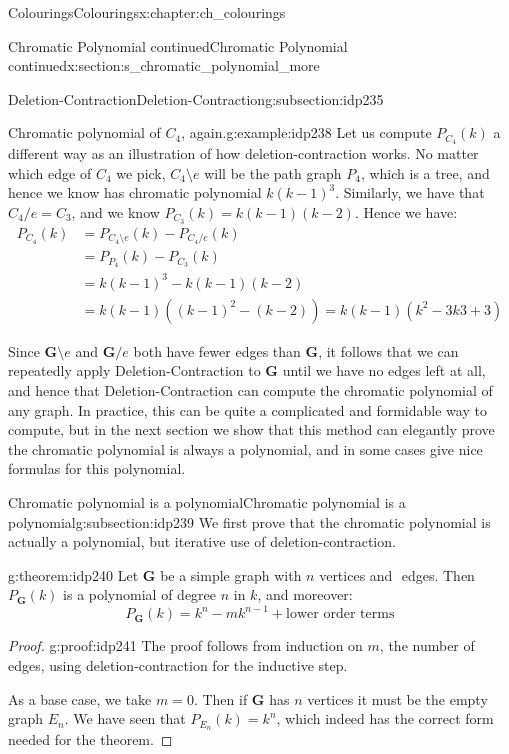 \documentclass[oneside,10pt,]{book}
\numberwithin{equation}{section}
\newcommand{\bfG}{\mathbf{G}}
\newcommand{\amp}{&}
\begin{document}
\begin{chapterptx}{Colourings}{}{Colourings}{}{}{x:chapter:ch_colourings}
\begin{sectionptx}{Chromatic Polynomial continued}{}{Chromatic Polynomial continued}{}{}{x:section:s_chromatic_polynomial_more}
\begin{subsectionptx}{Deletion-Contraction}{}{Deletion-Contraction}{}{}{g:subsection:idp235}
\begin{example}{Chromatic polynomial of \(C_4\), again.}{g:example:idp238}
Let us compute \(P_{C_4}(k)\) a different way as an illustration of how deletion-contraction works.  No matter which edge of \(C_4\) we pick, \(C_4\setminus e\) will be the path graph \(P_4\), which is a tree, and hence we know has chromatic polynomial \(k(k-1)^3\).  Similarly, we have that \(C_4/e=C_3\), and we know \(P_{C_3}(k)=k(k-1)(k-2)\).  Hence we have:%
%
\begin{align*}
P_{C_4}(k) \amp = P_{C_4\setminus e}(k)-P_{C_4/e}(k) \\
\amp = P_{P_4}(k)-P_{C_3}(k) \\
\amp = k(k-1)^3 - k(k-1)(k-2) \\
\amp = k(k-1)\left( (k-1)^2-(k-2)\right) = k(k-1)(k^2-3k3+3)
\end{align*}
\end{example}
Since \(\bfG\setminus e\) and \(\bfG/e\) both have fewer edges than \(\bfG\), it follows that we can repeatedly apply Deletion-Contraction to \(\bfG\) until we have no edges left at all, and hence that Deletion-Contraction can compute the chromatic polynomial of any graph.  In practice, this can be quite a complicated and formidable way to compute, but in the next section we show that this method can elegantly prove the chromatic polynomial is always a polynomial, and in some cases give nice formulas for this polynomial.%
\end{subsectionptx}
%
%
\typeout{************************************************}
\typeout{************************************************}
%
\begin{subsectionptx}{Chromatic polynomial is a polynomial}{}{Chromatic polynomial is a polynomial}{}{}{g:subsection:idp239}
We first prove that the chromatic polynomial is actually a polynomial, but iterative use of deletion-contraction.%
\begin{theorem}{}{}{g:theorem:idp240}%
Let \(\bfG\) be a simple graph with \(n\) vertices and \(\) edges.  Then \(P_\bfG(k)\) is a polynomial of degree \(n\) in \(k\), and moreover:%
%
\begin{equation*}
P_\bfG(k)=k^n-mk^{n-1}+\text{lower order terms}
\end{equation*}
\end{theorem}
\begin{proof}{}{g:proof:idp241}
The proof follows from induction on \(m\), the number of edges, using deletion-contraction for the inductive step.%
\par
As a base case, we take \(m=0\).  Then if \(\bfG\) has \(n\) vertices it must be the empty graph \(E_n\).  We have seen that \(P_{E_n}(k)=k^n\), which indeed has the correct form needed for the theorem.%

\end{proof}
\end{subsectionptx}
\end{sectionptx}
\end{chapterptx}
\end{document}
